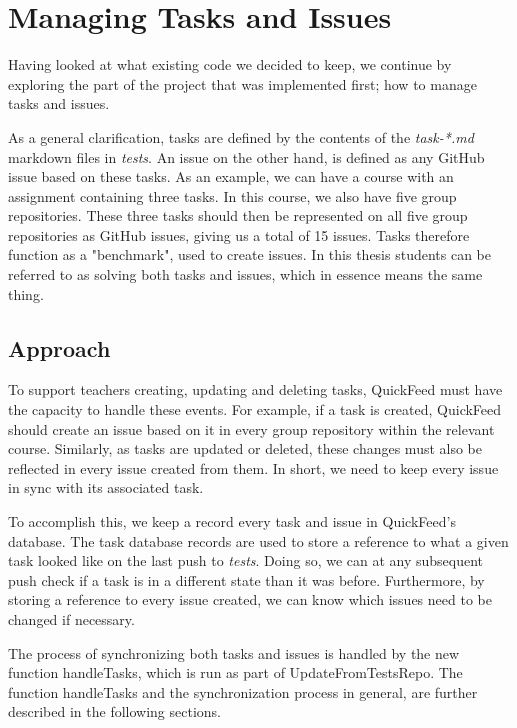 \section{Managing Tasks and Issues}

Having looked at what existing code we decided to keep, we continue by exploring the part of the project that was implemented first; how to manage tasks and issues.

As a general clarification, tasks are defined by the contents of the \textit{task-*.md} markdown files in \textit{tests}.
An issue on the other hand, is defined as any GitHub issue based on these tasks.
As an example, we can have a course with an assignment containing three tasks.
In this course, we also have five group repositories.
These three tasks should then be represented on all five group repositories as GitHub issues, giving us a total of 15 issues.
Tasks therefore function as a "benchmark", used to create issues.
In this thesis students can be referred to as solving both tasks and issues, which in essence means the same thing.

\subsection{Approach}

To support teachers creating, updating and deleting tasks, QuickFeed must have the capacity to handle these events.
For example, if a task is created, QuickFeed should create an issue based on it in every group repository within the relevant course.
Similarly, as tasks are updated or deleted, these changes must also be reflected in every issue created from them.
In short, we need to keep every issue in sync with its associated task.

To accomplish this, we keep a record every task and issue in QuickFeed's database.
The task database records are used to store a reference to what a given task looked like on the last push to \textit{tests}.
Doing so, we can at any subsequent push check if a task is in a different state than it was before.
Furthermore, by storing a reference to every issue created, we can know which issues need to be changed if necessary.

The process of synchronizing both tasks and issues is handled by the new function handleTasks, which is run as part of UpdateFromTestsRepo.
The function handleTasks and the synchronization process in general, are further described in the following sections. 

